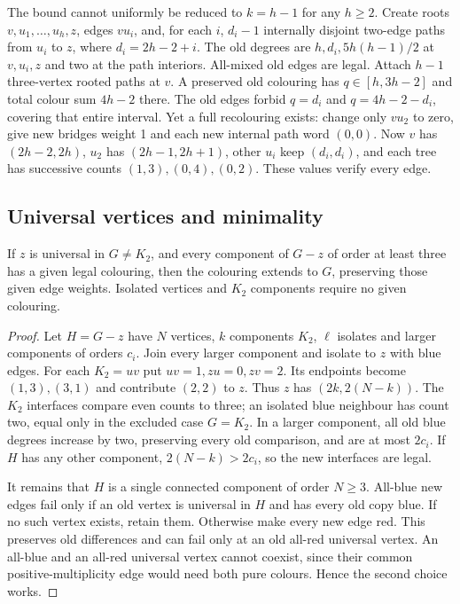 The bound cannot uniformly be reduced to $k=h-1$ for any $h\ge2$.
Create roots $v,u_1,\ldots,u_h,z$, edges $vu_i$, and, for each
$i$, $d_i-1$ internally disjoint two-edge paths from $u_i$ to $z$,
where $d_i=2h-2+i$. The old degrees are $h,d_i,5h(h-1)/2$ at
$v,u_i,z$ and two at the path interiors. All-mixed old edges are
legal. Attach $h-1$ three-vertex rooted paths at $v$. A preserved
old colouring has $q\in[h,3h-2]$ and total colour sum $4h-2$ there.
The old edges forbid $q=d_i$ and $q=4h-2-d_i$, covering that entire
interval. Yet a full recolouring exists: change only $vu_2$ to zero,
give new bridges weight 1 and each new internal path word $(0,0)$.
Now $v$ has $(2h-2,2h)$, $u_2$ has $(2h-1,2h+1)$, other
$u_i$ keep $(d_i,d_i)$, and each tree has successive counts
$(1,3),(0,4),(0,2)$. These values verify every edge.

\subsection{Universal vertices and minimality}

\begin{theorem}\label{thm:universal}
If $z$ is universal in $G\ne K_2$, and every component of $G-z$
of order at least three has a given legal colouring, then the
colouring extends to $G$, preserving those given edge weights.
Isolated vertices and $K_2$ components require no given colouring.
\end{theorem}
\begin{proof}
Let $H=G-z$ have $N$ vertices, $k$ components $K_2$, $\ell$
isolates and larger components of orders $c_i$. Join every larger
component and isolate to $z$ with blue edges. For each $K_2=uv$
put $uv=1,zu=0,zv=2$. Its endpoints become $(1,3),(3,1)$ and
contribute $(2,2)$ to $z$. Thus $z$ has
$(2k,2(N-k))$. The $K_2$ interfaces compare even counts to three;
an isolated blue neighbour has count two, equal only in the excluded
case $G=K_2$. In a larger component, all old blue degrees increase
by two, preserving every old comparison, and are at most $2c_i$.
If $H$ has any other component, $2(N-k)>2c_i$, so the new
interfaces are legal.

It remains that $H$ is a single connected component of order $N\ge3$.
All-blue new edges fail only if an old vertex is universal in $H$
and has every old copy blue. If no such vertex exists, retain them.
Otherwise make every new edge red. This preserves old differences
and can fail only at an old all-red universal vertex. An all-blue
and an all-red universal vertex cannot coexist, since their common
positive-multiplicity edge would need both pure colours. Hence the
second choice works.
\end{proof}

